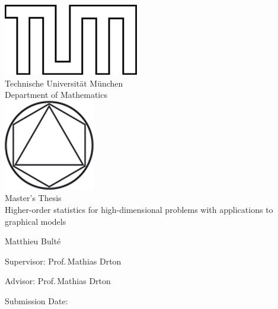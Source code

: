 
\pagestyle{empty}

\begin{titlepage}
    \begin{center}
    \includegraphics{TUMlschwarz.png}\\[3mm]
    \sf
    {\Large
      Technische Universit\"at M\"unchen\\[5mm]
      Department of Mathematics\\[8mm]
    }
    \normalsize
    \includegraphics{TUMlMschwarz.png}\\[15mm]
    
    Master's Thesis\\[15mm]
    
    {\Huge
    Higher-order statistics for high-dimensional problems with applications to graphical models
    }
    \bigskip
    
    \normalsize
    
    Matthieu Bult\'e
    \end{center}
    \vspace*{75mm}
    
    Supervisor: Prof.\,Mathias Drton
    \medskip
    
    Advisor: Prof.\,Mathias Drton
    \medskip
    
    Submission Date: 
    
\end{titlepage}



\newpage


\newpage


\newpage


\newpage
{}
\pagestyle{headings}